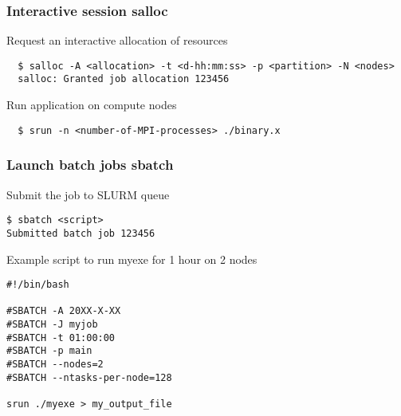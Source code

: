 \begin{frame}[fragile]
\frametitle{Interactive session \hfill \alert{\textbf{salloc}}}

\begin{exampleblock}{Request an interactive allocation of resources}
  \footnotesize
  \begin{verbatim}
  $ salloc -A <allocation> -t <d-hh:mm:ss> -p <partition> -N <nodes>
  salloc: Granted job allocation 123456
  \end{verbatim}
\end{exampleblock}

\begin{exampleblock}{Run application on compute nodes}
  \footnotesize
  \begin{verbatim}
  $ srun -n <number-of-MPI-processes> ./binary.x
  \end{verbatim}
\end{exampleblock}
  
\end{frame}

\begin{frame}[fragile]
\frametitle{Launch batch jobs \hfill  \alert{\textbf{sbatch}}}
\begin{exampleblock}{Submit the job to SLURM queue}
\footnotesize
\begin{verbatim}
$ sbatch <script>
Submitted batch job 123456
\end{verbatim}
\end{exampleblock}

\begin{exampleblock}{Example script to run myexe for 1 hour on 2 nodes}
\footnotesize
\begin{verbatim}
#!/bin/bash

#SBATCH -A 20XX-X-XX
#SBATCH -J myjob
#SBATCH -t 01:00:00
#SBATCH -p main
#SBATCH --nodes=2
#SBATCH --ntasks-per-node=128

srun ./myexe > my_output_file
\end{verbatim}
\end{exampleblock}

\end{frame}

